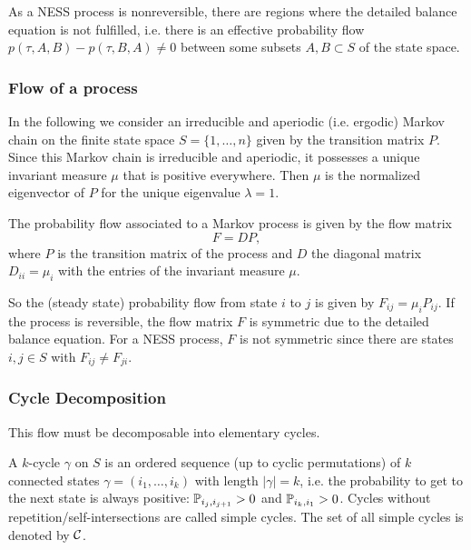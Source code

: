 As a NESS process is nonreversible, there are regions where the detailed balance equation is not fulfilled, i.e. there is an effective probability flow $p(\tau, A, B) - p(\tau,B,A) \neq 0$ between some subsets $A,B \subset S$ of the state space.

\subsubsection*{Flow of a process}

In the following we consider an irreducible and aperiodic (i.e. ergodic) Markov chain on the finite state space $S= \{1,\dots,n\}$ given by the transition matrix $P$. Since this Markov chain is irreducible and aperiodic, it possesses a unique invariant measure $\mu$ that is positive everywhere. 
Then $\mu$ is the normalized eigenvector of $P$ for the unique eigenvalue $\lambda = 1$.

\begin{defi}
The probability flow associated to a Markov process is given by the flow matrix
\begin{equation*}
F = DP,
\end{equation*}
where $P$ is the transition matrix of the process and $D$ the diagonal matrix $D_{ii} = \mu_i$ with the entries of the invariant measure $\mu$.
\end{defi}
So the (steady state) probability flow from state $i$ to $j$ is given by $F_{ij} = \mu_i P_{ij}$.
If the process is reversible, the flow matrix $F$ is symmetric due to the detailed balance equation. For a NESS process, $F$ is not symmetric since there are states $i,j \in S$ with $F_{ij} \neq F_{ji}$.

\subsubsection*{Cycle Decomposition}

This flow must be decomposable into elementary cycles. 

\begin{defi}
A $k$-cycle $\gamma$ on $S$ is an ordered sequence (up to cyclic permutations) of $k$ connected states $\gamma = (i_1,\dots,i_k)$ with length $|\gamma| = k$, i.e. the probability to get to the next state is always positive: $\mathbb{P}_{i_j, i_{j+1}} > 0$ and $\mathbb{P}_{i_k,i_1} > 0$.
Cycles without repetition/self-intersections are called simple cycles. The set of all simple cycles is denoted by $\mathcal{C}$.
\end{defi}

